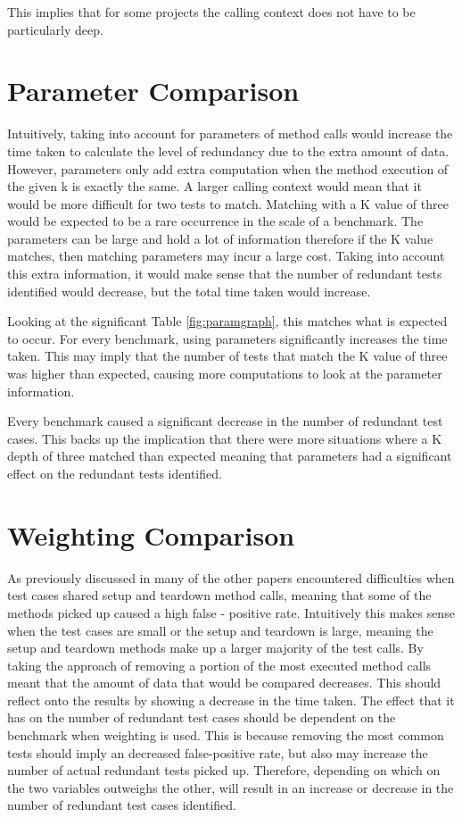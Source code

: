 This implies that for some projects the calling context does not have to be particularly deep.



\section{Parameter Comparison}
\label{sec:param}
Intuitively, taking into account for parameters of method calls would increase the time taken to calculate the level of redundancy due to the extra amount of data. However, parameters only add extra computation when the method execution of the given k is exactly the same.  A larger calling context would mean that it would be more difficult for two tests to match. Matching with a K value of three would be expected to be a rare occurrence in the scale of a benchmark. The parameters can be large and hold a lot of information therefore if the K value matches, then matching parameters may incur a large cost. Taking into account this extra information, it would make sense that the number of redundant tests identified would decrease, but the total time taken would increase. 

Looking at the significant Table \ref{fig:paramgraph}, this matches what is expected to occur. For every benchmark, using parameters significantly increases the time taken. This may imply that the number of tests that match the K value of three was higher than expected, causing more computations to look at the parameter information.

Every benchmark caused a significant decrease in the number of redundant test cases. This backs up the implication that there were more situations where a K depth of three matched than expected meaning that parameters had a significant effect on the redundant tests identified. 


\section{Weighting Comparison}
\label{sec:weight}
As previously discussed in  many of the other papers encountered difficulties when test cases shared setup and teardown method calls, meaning that some of the methods picked up caused a high false - positive rate. Intuitively this makes sense when the test cases are small or the setup and teardown is large, meaning the setup and teardown methods make up a larger majority of the test calls. By taking the approach of removing a portion of the most executed method calls meant that the amount of data that would be compared decreases. This should reflect onto the results by showing a decrease in the time taken. The effect that it has on the number of redundant test cases should be dependent on the benchmark when weighting is used. This is because removing the most common tests should imply an decreased false-positive rate, but also may increase the number of actual redundant tests picked up. Therefore, depending on which on the two variables outweighs the other, will result in an increase or decrease in the number of redundant test cases identified.

